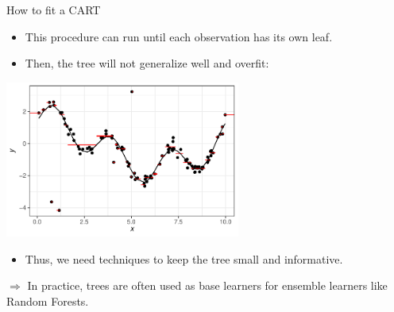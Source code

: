 \documentclass[11pt,compress,t,notes=noshow, xcolor=table]{beamer}
\begin{document}
\begin{vbframe}{How to fit a CART}
\begin{itemize}
\item This procedure can run until each observation has its own leaf.
\item Then, the tree will not generalize well and overfit:
\end{itemize}

{\centering \includegraphics[width=0.58\textwidth]{figure/tree-overfitting-prediction.pdf} 

}

\begin{itemize}
\item Thus, we need techniques to keep the tree small and informative.
\end{itemize}

$\Rightarrow$ In practice, trees are often used as base learners for ensemble learners like Random Forests.

\end{vbframe}

\end{document}

